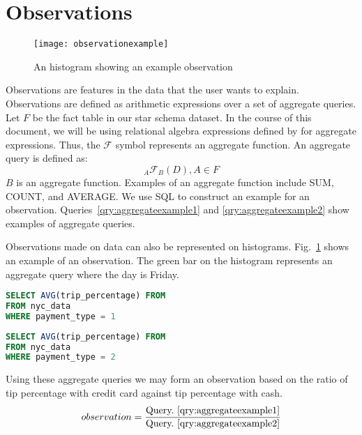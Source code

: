 \section{Observations}
\begin{figure}[ht]
  \begin{center}
  \texttt{[image: observationexample]}
  \end{center}

  \caption{An histogram showing an example observation}
  \label{fig:observation_example}
\end{figure}
Observations are features in the data that the user wants to explain. Observations are defined as arithmetic expressions over a set of aggregate queries. Let $F$ be the fact table in our star schema dataset. In the course of this document, we will be using relational algebra expressions defined by \cite{elmasri2011fundamentals} for aggregate expressions. Thus, the $\mathscr{F}$ symbol represents an aggregate function. An aggregate query is defined as:
$$_A\mathscr{F}_B(D), A \in F$$
$B$ is an aggregate function. Examples of an aggregate function include SUM, COUNT, and AVERAGE.
We use SQL to construct an example for an observation. Queries~\ref{qry:aggregateexample1} and \ref{qry:aggregateexample2} show examples of aggregate queries.

Observations made on data can also be represented on histograms. Fig.~\ref{fig:observation_example} shows an example of an observation. The green bar on the histogram represents an aggregate query where the day is Friday.

\renewcommand{\lstlistingname}{Query}%
\begin{lstlisting}[language=SQL, caption=Aggregate Query for average tip percentage with credit cards, label=qry:aggregateexample1]
SELECT AVG(trip_percentage) FROM
FROM nyc_data
WHERE payment_type = 1
\end{lstlisting}

\renewcommand{\lstlistingname}{Query}%
\begin{lstlisting}[language=SQL, caption=Aggregate Query for average tip percentage with cash, label=qry:aggregateexample2]
SELECT AVG(trip_percentage) FROM
FROM nyc_data
WHERE payment_type = 2
\end{lstlisting}

Using these aggregate queries we may form an observation based on the ratio of tip percentage with credit card against tip percentage with cash.
$$observation = \frac{\textnormal{Query.~\ref{qry:aggregateexample1}}}{\textnormal{Query.~\ref{qry:aggregateexample2}}}$$


